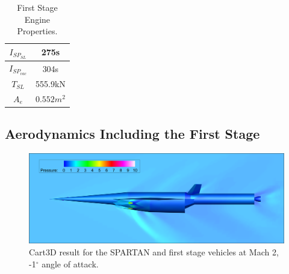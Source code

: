 \begin{table}[!h]
	\centering
	\begin{tabular}{|c|c|}
		\hline  $I_{SP_{SL}}$ & 275s \\ 
		\hline  $I_{SP_{vac}}$ & 304s\\ 
		\hline  $T_{SL}$ & 555.9kN \\ 
		\hline  $A_{e}$ & $0.552m^2$ \\ 
		\hline 
	\end{tabular} 
	\caption{First Stage Engine Properties\cite{Wade2017}.}
	\label{tab:1stStageEngine}
\end{table}


  \subsection{Aerodynamics Including the First Stage}\label{sec:firststageaero}
   \begin{figure}
   	\centering
   	\includegraphics[width=0.8\linewidth]{figures/3_vehicle_design/CARTcontour}
   	\caption{Cart3D result for the SPARTAN and first stage vehicles at Mach 2, -1$^\circ$ angle of attack.}
   	\label{fig:CARTcontour}
   \end{figure}
   
